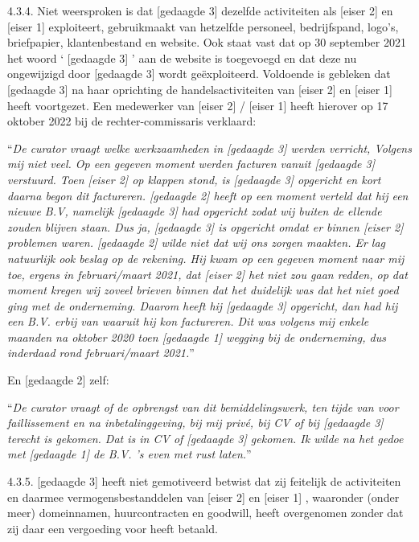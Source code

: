 \documentclass[
  dutch,
  a4paper,
]{article}
\begin{document}
4.3.4. Niet weersproken is dat {[}gedaagde 3{]} dezelfde activiteiten als {[}eiser 2{]} en {[}eiser 1{]} exploiteert, gebruikmaakt van hetzelfde personeel, bedrijfspand, logo's, briefpapier, klantenbestand en website. Ook staat vast dat op 30 september 2021 het woord ` {[}gedaagde 3{]} ' aan de website is toegevoegd en dat deze nu ongewijzigd door {[}gedaagde 3{]} wordt geëxploiteerd. Voldoende is gebleken dat {[}gedaagde 3{]} na haar oprichting de handelsactiviteiten van {[}eiser 2{]} en {[}eiser 1{]} heeft voortgezet. Een medewerker van {[}eiser 2{]} / {[}eiser 1{]} heeft hierover op 17 oktober 2022 bij de rechter-commissaris verklaard:

``\emph{De curator vraagt welke werkzaamheden in {[}gedaagde 3{]} werden verricht, Volgens mij niet veel. Op een gegeven moment werden facturen vanuit {[}gedaagde 3{]} verstuurd. Toen {[}eiser 2{]} op klappen stond, is {[}gedaagde 3{]} opgericht en kort daarna begon dit factureren. {[}gedaagde 2{]} heeft op een moment verteld dat hij een nieuwe B.V, namelijk {[}gedaagde 3{]} had opgericht zodat wij buiten de ellende zouden blijven staan. Dus ja, {[}gedaagde 3{]} is opgericht omdat er binnen {[}eiser 2{]} problemen waren. {[}gedaagde 2{]} wilde niet dat wij ons zorgen maakten. Er lag natuurlijk ook beslag op de rekening. Hij kwam op een gegeven moment naar mij toe, ergens in februari/maart 2021, dat {[}eiser 2{]} het niet zou gaan redden, op dat moment kregen wij zoveel brieven binnen dat het duidelijk was dat het niet goed ging met de onderneming. Daarom heeft hij {[}gedaagde 3{]} opgericht, dan had hij een B.V. erbij van waaruit hij kon factureren. Dit was volgens mij enkele maanden na oktober 2020 toen {[}gedaagde 1{]} wegging bij de onderneming, dus inderdaad rond februari/maart 2021.}''

En {[}gedaagde 2{]} zelf:

``\emph{De curator vraagt of de opbrengst van dit bemiddelingswerk, ten tijde van voor faillissement en na inbetalinggeving, bij mij privé, bij CV of bij {[}gedaagde 3{]} terecht is gekomen. Dat is in CV of {[}gedaagde 3{]} gekomen. Ik wilde na het gedoe met {[}gedaagde 1{]} de B.V. 's even met rust laten.}''

4.3.5. {[}gedaagde 3{]} heeft niet gemotiveerd betwist dat zij feitelijk de activiteiten en daarmee vermogensbestanddelen van {[}eiser 2{]} en {[}eiser 1{]} , waaronder (onder meer) domeinnamen, huurcontracten en goodwill, heeft overgenomen zonder dat zij daar een vergoeding voor heeft betaald.
\end{document}
